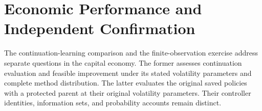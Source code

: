 \section{Economic Performance and Independent Confirmation}\label{sec:r15evidence}
The continuation-learning comparison and the finite-observation exercise
address separate questions in the capital economy. The former assesses
continuation evaluation and feasible improvement under its stated volatility
parameters and complete method distribution. The latter evaluates the original
saved policies with a protected parent at their original volatility parameters.
Their controller identities, information sets, and probability accounts remain
distinct.














